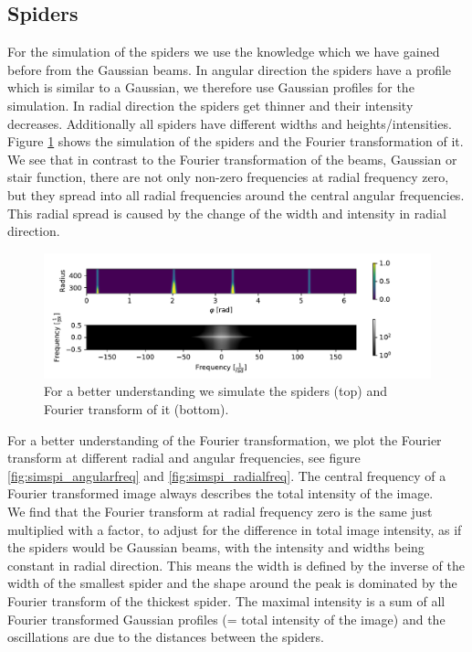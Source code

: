 \subsection{Spiders}
For the simulation of the spiders we use the knowledge which we have gained before from the Gaussian beams. In angular direction the spiders have a profile which is similar to a Gaussian, we therefore use Gaussian profiles for the simulation. In radial direction the spiders get thinner and their intensity decreases. Additionally all spiders have different widths and heights/intensities. Figure \ref{fig:simulated_spyder} shows the simulation of the spiders and the Fourier transformation of it. We see that in contrast to the Fourier transformation of the beams, Gaussian or stair function, there are not only non-zero frequencies at radial frequency zero, but they spread into all radial frequencies around the central angular frequencies. This radial spread is caused by the change of the width and intensity in radial direction.\\
\begin{figure}[H]
	\centering
		\includegraphics[width=1.1\textwidth]{pics/simulated_spyder.pdf}
		\caption{For a better understanding we simulate the spiders (top) and Fourier transform of it (bottom).}
		\label{fig:simulated_spyder}
\end{figure}
For a better understanding of the Fourier transformation, we plot the Fourier transform at different radial and angular frequencies, see figure \ref{fig:simspi_angularfreq} and \ref{fig:simspi_radialfreq}. The central frequency of a Fourier transformed image always describes the total intensity of the image.\\
We find that the Fourier transform at radial frequency zero is the same just multiplied with a factor, to adjust for the difference in total image intensity, as if the spiders would be Gaussian beams, with the intensity and widths being constant in radial direction. This means the width is defined by the inverse of the width of the smallest spider and the shape around the peak is dominated by the Fourier transform of the thickest spider. The maximal intensity is a sum of all Fourier transformed Gaussian profiles (= total intensity of the image) and the oscillations are due to the distances between the spiders. \\
